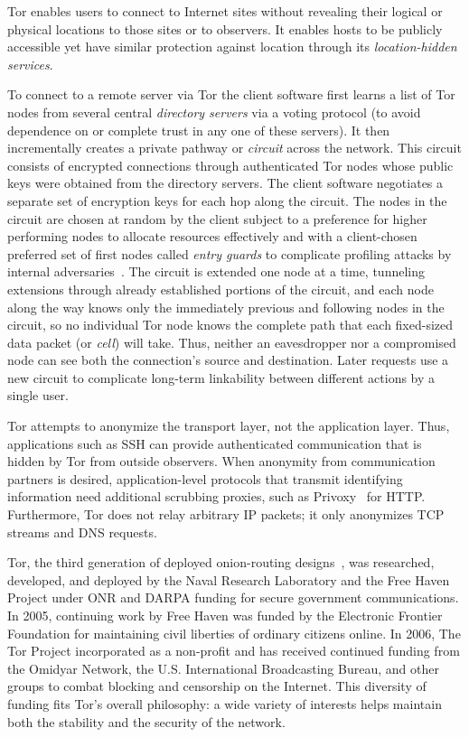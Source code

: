 \documentclass{llncs}
\begin{document}
Tor enables users to connect to Internet sites without revealing their
logical or physical locations to those sites or to observers.  It
enables hosts to be publicly accessible yet have similar protection
against location through its \emph{location-hidden services}.

To connect to a remote server via Tor the client software first learns
a %
list of Tor nodes from several central \emph{directory servers} via a
voting protocol (to avoid dependence on or complete trust in any one
of these servers). It then incrementally creates a private pathway or
\emph{circuit} across the network. This circuit consists of
encrypted connections through authenticated Tor nodes
whose public keys were obtained from the directory servers. The client
software negotiates a separate set of encryption keys for each hop along the
circuit. The nodes in the circuit are chosen at random by the client
subject to a preference for higher performing nodes to allocate
resources effectively and with a client-chosen preferred set of first
nodes called \emph{entry guards} to complicate profiling attacks by
internal adversaries~\cite{hs-attack}.
The circuit is extended one node at a time, tunneling extensions
through already established portions of the circuit, and each node
along the way knows only the immediately previous and following nodes
in the circuit, so no individual Tor node knows the complete path that
each fixed-sized data packet (or \emph{cell}) will take.  Thus,
neither an eavesdropper nor a compromised node can see both the
connection's source and destination.  Later requests use a new
circuit to complicate long-term linkability between different actions
by a single user.

Tor attempts to anonymize the transport layer, not the application
layer.  Thus, applications such as SSH can provide
authenticated communication that is hidden by Tor from outside observers.
When anonymity from communication partners is desired,
application-level protocols that transmit identifying
information need additional scrubbing proxies, such as
Privoxy~\cite{privoxy} for HTTP\@.  Furthermore, Tor does not relay
arbitrary IP packets; it only anonymizes TCP streams and DNS requests.

Tor, the third generation of deployed onion-routing
designs~\cite{or-ih96,or-jsac98,tor-design}, was researched, developed,
and deployed by the Naval Research Laboratory and the Free Haven
Project under ONR and DARPA funding for secure government
communications.  In 2005, continuing work by Free Haven was funded by
the Electronic Frontier Foundation for maintaining civil liberties of
ordinary citizens online. In 2006, The Tor Project incorporated as a
non-profit and has received continued funding from the Omidyar Network,
the U.S. International Broadcasting Bureau, and other groups to combat
blocking and censorship on the Internet. This diversity of funding fits
Tor's overall philosophy: a wide variety of interests helps maintain
both the stability and the security of the network.
\end{document}
